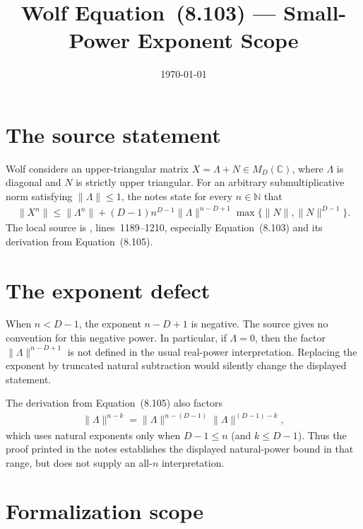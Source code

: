 \documentclass{article}
\title{Wolf Equation~(8.103) --- Small-Power Exponent Scope}
\author{}
\date{\today}
\begin{document}
\maketitle
{}

\section{The source statement}

Wolf considers an upper-triangular matrix $X=\Lambda+N\in M_D(\mathbb C)$,
where $\Lambda$ is diagonal and $N$ is strictly upper triangular.  For an
arbitrary submultiplicative norm satisfying $\lVert\Lambda\rVert\le 1$, the
notes state for every $n\in\mathbb N$ that
\begin{align}
  \lVert X^n\rVert
  \le \lVert\Lambda^n\rVert
  +(D-1)n^{D-1}\lVert\Lambda\rVert^{n-D+1}
    \max\{\lVert N\rVert,\lVert N\rVert^{D-1}\}.
\end{align}
The local source is
, lines~1189--1210,
especially Equation~(8.103) and its derivation from Equation~(8.105).

\section{The exponent defect}

When $n<D-1$, the exponent $n-D+1$ is negative.  The source gives no
convention for this negative power.  In particular, if $\Lambda=0$, then the
factor $\lVert\Lambda\rVert^{n-D+1}$ is not defined in the usual real-power
interpretation.  Replacing the exponent by truncated natural subtraction
would silently change the displayed statement.

The derivation from Equation~(8.105) also factors
\begin{align}
  \lVert\Lambda\rVert^{n-k}
  =\lVert\Lambda\rVert^{n-(D-1)}
   \lVert\Lambda\rVert^{(D-1)-k},
\end{align}
which uses natural exponents only when $D-1\le n$ (and $k\le D-1$).
Thus the proof printed in the notes establishes the displayed natural-power
bound in that range, but does not supply an all-$n$ interpretation.

\section{Formalization scope}
\end{document}
